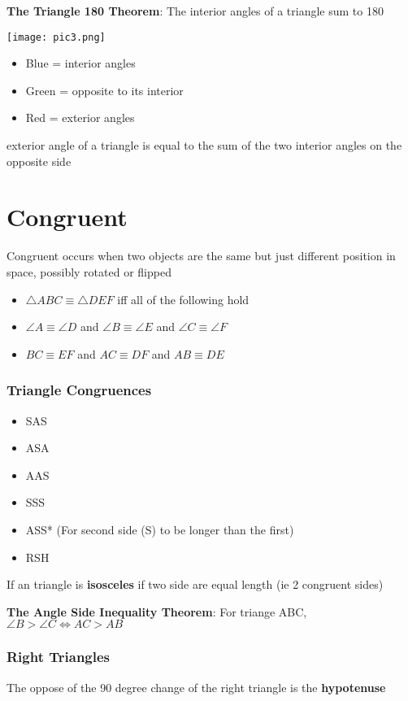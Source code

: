 \documentclass[11pt]{article}
\begin{document}
\noindent \textbf{The Triangle 180 Theorem}: The interior angles of a triangle sum to 180

\texttt{[image: pic3.png]}
\begin{itemize}
  \item Blue = interior angles
  \item Green = opposite to its interior
  \item Red = exterior angles
\end{itemize}
\noindent exterior angle of a triangle is equal to the sum of the two interior angles on the opposite side

\section{Congruent }
Congruent occurs when two objects are the same but just different position in space, possibly rotated or flipped
\begin{itemize}
  \item $\triangle ABC \equiv \triangle DEF$ iff all of the following hold
  \item $\angle A \equiv \angle D$ and $\angle B \equiv \angle E$ and $\angle C \equiv \angle F$ 
  \item $BC \equiv EF$ and $AC \equiv DF$ and $AB \equiv DE$ 
\end{itemize}
\subsubsection{Triangle Congruences}
\begin{itemize}
  \item SAS
  \item ASA
  \item AAS
  \item SSS
  \item ASS* (For second side (S) to be longer than the first)
  \item RSH
\end{itemize}
If an triangle is \textbf{isosceles} if two side are equal length (ie 2 congruent sides)

\noindent \textbf{The Angle Side Inequality Theorem}: For triange ABC, $\angle B > \angle C \iff AC > AB$

\subsubsection{Right Triangles}
The oppose of the 90 degree change of the right triangle is the \textbf{hypotenuse}
\end{document}

